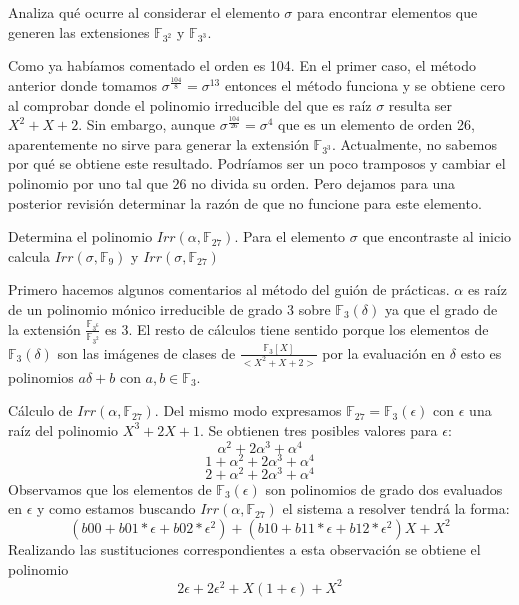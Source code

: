 \begin{exercise}
	Analiza qué ocurre al considerar el elemento $\sigma$ para encontrar elementos que generen las extensiones $\mathbb{F}_{3^2}$ y $\mathbb{F}_{3^3}$.
\end{exercise}

Como ya habíamos comentado el orden es 104. En el primer caso, el método anterior donde tomamos $\sigma^{\frac{104}{8}} = \sigma^13$ entonces el método funciona y se obtiene cero al comprobar donde el polinomio irreducible del que es raíz $\sigma$ resulta ser $X^2+X+2$. Sin embargo, aunque $\sigma^{\frac{104}{26}} = \sigma^4$ que es un elemento de orden 26, aparentemente no sirve para generar la extensión $\mathbb{F}_{3^3}$. Actualmente, no sabemos por qué se obtiene este resultado. Podríamos ser un poco tramposos y cambiar el polinomio por uno tal que $26$ no divida su orden. Pero dejamos para una posterior revisión determinar la razón de que no funcione para este elemento. 

\begin{exercise}
	Determina el polinomio $Irr(\alpha,\mathbb{F}_{27})$. Para el elemento $\sigma$ que encontraste al inicio calcula $Irr(\sigma,\mathbb{F}_9)$ y $Irr(\sigma,\mathbb{F}_{27})$
\end{exercise}

Primero hacemos algunos comentarios al método del guión de prácticas. $\alpha$ es raíz de un polinomio mónico irreducible de grado 3 sobre $\mathbb{F}_3(\delta)$ ya que el grado de la extensión $\frac{\mathbb{F}_{3^6}}{\mathbb{F}_{3^2}}$ es 3. El resto de cálculos tiene sentido porque los elementos de $\mathbb{F}_3(\delta)$ son las imágenes de clases de $\frac{\mathbb{F}_3[X]}{<X^2+X+2>}$ por la evaluación en $\delta$ esto es polinomios $a\delta + b$ con $a,b \in \mathbb{F}_3$. 

Cálculo de $Irr(\alpha,\mathbb{F}_{27})$. Del mismo modo expresamos $\mathbb{F}_{27} = \mathbb{F}_3(\epsilon)$ con $\epsilon$ una raíz del polinomio $X^3 + 2X + 1$.  Se obtienen tres posibles valores para $\epsilon$: $$\alpha^2+2\alpha^3+\alpha^4$$ $$1+\alpha^2+2\alpha^3+\alpha^4$$ $$2+\alpha^2+2\alpha^3+\alpha^4$$ Observamos que los elementos de $\mathbb{F}_3(\epsilon)$ son polinomios de grado dos evaluados en $\epsilon$ y como estamos buscando $Irr(\alpha,\mathbb{F}_{27})$ el sistema a resolver tendrá la forma: $$(b00 + b01*\epsilon + b02*\epsilon^2) + (b10 + b11*\epsilon + b12*\epsilon^2) X + X^2$$ Realizando las sustituciones correspondientes a esta observación se obtiene el polinomio $$2 \epsilon + 2 \epsilon^2 + X (1 + \epsilon) + X^2$$


